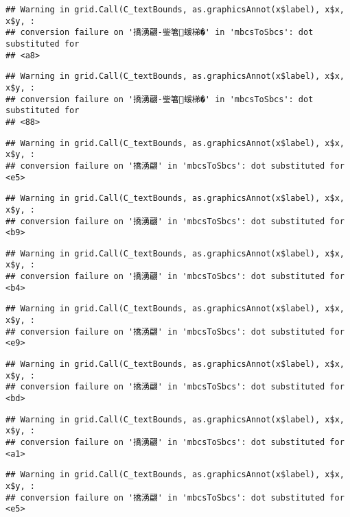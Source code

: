 \documentclass[
]{article}
\begin{document}
\begin{verbatim}
## Warning in grid.Call(C_textBounds, as.graphicsAnnot(x$label), x$x, x$y, :
## conversion failure on '撟湧翩-鈭箸蝯梯�' in 'mbcsToSbcs': dot substituted for
## <a8>
\end{verbatim}

\begin{verbatim}
## Warning in grid.Call(C_textBounds, as.graphicsAnnot(x$label), x$x, x$y, :
## conversion failure on '撟湧翩-鈭箸蝯梯�' in 'mbcsToSbcs': dot substituted for
## <88>
\end{verbatim}

\begin{verbatim}
## Warning in grid.Call(C_textBounds, as.graphicsAnnot(x$label), x$x, x$y, :
## conversion failure on '撟湧翩' in 'mbcsToSbcs': dot substituted for <e5>
\end{verbatim}

\begin{verbatim}
## Warning in grid.Call(C_textBounds, as.graphicsAnnot(x$label), x$x, x$y, :
## conversion failure on '撟湧翩' in 'mbcsToSbcs': dot substituted for <b9>
\end{verbatim}

\begin{verbatim}
## Warning in grid.Call(C_textBounds, as.graphicsAnnot(x$label), x$x, x$y, :
## conversion failure on '撟湧翩' in 'mbcsToSbcs': dot substituted for <b4>
\end{verbatim}

\begin{verbatim}
## Warning in grid.Call(C_textBounds, as.graphicsAnnot(x$label), x$x, x$y, :
## conversion failure on '撟湧翩' in 'mbcsToSbcs': dot substituted for <e9>
\end{verbatim}

\begin{verbatim}
## Warning in grid.Call(C_textBounds, as.graphicsAnnot(x$label), x$x, x$y, :
## conversion failure on '撟湧翩' in 'mbcsToSbcs': dot substituted for <bd>
\end{verbatim}

\begin{verbatim}
## Warning in grid.Call(C_textBounds, as.graphicsAnnot(x$label), x$x, x$y, :
## conversion failure on '撟湧翩' in 'mbcsToSbcs': dot substituted for <a1>
\end{verbatim}

\begin{verbatim}
## Warning in grid.Call(C_textBounds, as.graphicsAnnot(x$label), x$x, x$y, :
## conversion failure on '撟湧翩' in 'mbcsToSbcs': dot substituted for <e5>
\end{verbatim}
\end{document}
